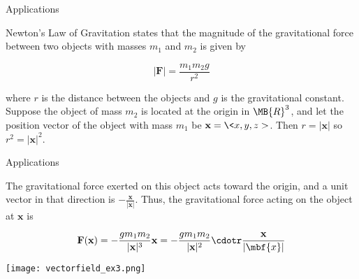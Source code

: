 \documentclass[11pt,english,
handout
]{beamer}
\begin{document}
\begin{frame}[t]{Applications}
\lspace
\begin{example}
Newton's Law of Gravitation states that the magnitude of the gravitational force between two objects with masses $m_1$ and $m_2$ is given by

\[
|\mathbf{F}|=\frac{m_1m_2g}{r^2}
\]

where $r$ is the distance between the objects and $g$ is the gravitational constant. \pause Suppose the object of mass $m_2$ is located at the origin in $\MB{R}^3$, and let the position vector of the object with mass $m_1$ be $\mathbf{x}=\<x,y,z>$. Then $r=|\mathbf{x}|$ so $r^2=|\mathbf{x}|^2$.
\end{example}
\end{frame}









\begin{frame}[t]{Applications}
\lspace
\begin{example}

The gravitational force exerted on this object acts toward the origin, and a unit vector in that direction is $-\frac{\mathbf{x}}{|\mathbf{x}|}$. \pause Thus, the gravitational force acting on the object at $\mathbf{x}$ is

\begin{minipage}{0.5\textwidth}
\[
\mathbf{F}(\mathbf{x})=-\frac{gm_1m_2}{|\mathbf{x}|^3}\mathbf{x}=-\frac{gm_1m_2}{|\mathbf{x}|^2}\cdotr\frac{\mathbf{x}}{|\mbf{x}|}
\]
\end{minipage}%
\begin{minipage}{0.5\textwidth}
\centering
\texttt{[image: vectorfield\_ex3.png]}
\end{minipage}
\end{example}
\end{frame}
\end{document}
